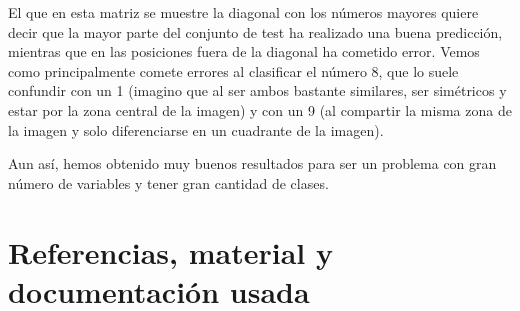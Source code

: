 \documentclass[12pt, spanish]{article}
\begin{document}
El que en esta matriz se muestre la diagonal con los números mayores quiere decir que la mayor parte del conjunto de test ha realizado una buena predicción, mientras que en las posiciones  fuera de la diagonal ha cometido error. Vemos como principalmente comete errores al clasificar el número 8, que lo suele confundir con un 1 (imagino que al ser ambos bastante similares, ser simétricos y estar por la zona central de la imagen) y con un 9 (al compartir la misma zona de la imagen y solo diferenciarse en un cuadrante de la imagen).

Aun así, hemos obtenido muy buenos resultados para ser un problema con gran número de variables y tener gran cantidad de clases.

\newpage


\section{Referencias, material y documentación usada}
\end{document}

